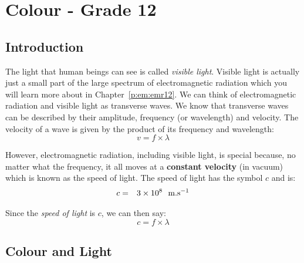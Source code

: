 



\chapter{Colour - Grade 12} 
\label{p:wsl:c12} 


\section{Introduction} 
The light that human beings can see is called \textit{visible light}. Visible light is actually just a small part of the large spectrum of electromagnetic radiation which you will learn more about in Chapter~\ref{p:em:emr12}. We can think of electromagnetic radiation and visible light as transverse waves. We know that transverse waves can be described by their amplitude, frequency (or wavelength) and velocity. The velocity of a wave is given by the product of its frequency and wavelength:
\begin{equation}
v = f \times \lambda
\end{equation}\label{eq:wavespeed} 

However, electromagnetic radiation, including visible light, is special because, no matter what the frequency, it all moves at a \textbf{constant velocity} (in vacuum) which is known as the speed of light. The speed of light has the symbol $c$ and is:
\begin{eqnarray*}
c &=& 3 \times 10^{8}~~\rm{m.s^{-1}}
\end{eqnarray*} 

Since the \textit{speed of light} is $c$, we can then say:
\begin{equation}
c = f \times \lambda
\end{equation}




\section{Colour and Light} 

